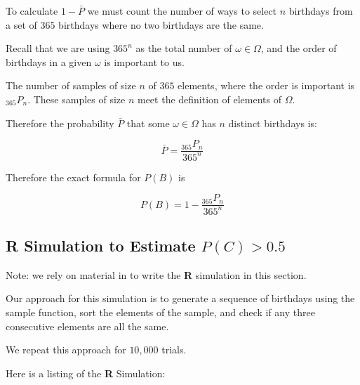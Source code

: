 \documentclass[a4paper,11pt]{article}
\begin{document}
To calculate $1-\bar{P}$ we must count the number of ways to select $n$
birthdays from a set of $365$ birthdays where no two birthdays are the
same.

Recall that we are using $365^{n}$ as the total number of
$\omega \in \Omega$, and the order of birthdays in a given $\omega${}
is important to us.

The number of samples of size $n$ of $365$ elements, where the order
is important is ${}_{365}P_{n}$. These samples of size $n$ meet the
definition of elements of $\Omega$.

Therefore the probability $\bar{P}$ that some $\omega \in \Omega$ has
$n$ distinct birthdays is:

\begin{equation}
  \bar{P} = \frac {{}_{365}P_{n}} {365^{n}}
\end{equation}

Therefore the exact formula for $P\left(B\right)$ is

\begin{equation}
  P\left(B\right) = 1 - \frac{{}_{365}P_{n}} {365^{n}}
\end{equation}

\subsection{\textbf{\textsf{R}} Simulation to Estimate 
  $P \left( C \right) > 0.5$}

Note: we rely on material in \cite{rmanualStatsOr} to write the
\textbf{\textsf{R}} simulation in this section.

Our approach for this simulation is to generate a sequence of birthdays
using the sample function, sort the elements of the sample, and check
if any three consecutive elements are all the same.

We repeat this approach for $10,000$ trials.

Here is a listing of the \textbf{\textsf{R}} Simulation:
\end{document}
